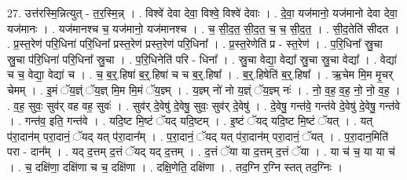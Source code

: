 \documentclass[17pt]{extarticle}
\begin{document}
27. उत्त॑रस्मि॒न्नित्युत् - त॒र॒स्मि॒न्न् । . विश्वे॑ देवा देवा॒ विश्वे॒ विश्वे॑ देवाः । . दे॒वा॒ यज॑मानो॒ यज॑मानो देवा देवा॒ यज॑मानः । . यज॑मानश्च च॒ यज॑मानो॒ यज॑मानश्च । . च॒ सी॒द॒त॒ सी॒द॒त॒ च॒ च॒ सी॒द॒त॒ । . सी॒द॒तेति॑ सीदत । . प्र॒स्त॒रेण॑ परि॒धिना॑ परि॒धिना᳚ प्रस्त॒रेण॑ प्रस्त॒रेण॑ परि॒धिना᳚ । . प्र॒स्त॒रेणेति॑ प्र - स्त॒रेण॑ । . प॒रि॒धिना᳚ स्रु॒चा स्रु॒चा प॑रि॒धिना॑ परि॒धिना᳚ स्रु॒चा । . प॒रि॒धिनेति॑ परि - धिना᳚ । . स्रु॒चा वेद्या॒ वेद्या᳚ स्रु॒चा स्रु॒चा वेद्या᳚ । . वेद्या॑ च च॒ वेद्या॒ वेद्या॑ च । . च॒ ब॒र्॒.हिषा॑ ब॒र्॒.हिषा॑ च च ब॒र्॒.हिषा᳚ । . ब॒र्॒.हिषेति॑ ब॒र्॒.हिषा᳚ । . ऋ॒चेम मि॒म मृ॒चर् चेमम् । . इ॒मं ॅय॒ज्ञ्ं ॅय॒ज्ञ् मि॒म मि॒मं ॅय॒ज्ञ्म् । . य॒ज्ञ्म् नो॑ नो य॒ज्ञ्ं ॅय॒ज्ञ्म् नः॑ । . नो॒ व॒ह॒ व॒ह॒ नो॒ नो॒ व॒ह॒ । . व॒ह॒ सुवः॒ सुव॑र् वह वह॒ सुवः॑ । . सुव॑र् दे॒वेषु॑ दे॒वेषु॒ सुवः॒ सुव॑र् दे॒वेषु॑ । . दे॒वेषु॒ गन्त॑वे॒ गन्त॑वे दे॒वेषु॑ दे॒वेषु॒ गन्त॑वे । . गन्त॑व॒ इति॒ गन्त॑वे । . यदि॒ष्ट मि॒ष्टं ॅयद् यदि॒ष्टम् । . इ॒ष्टं ॅयद् यदि॒ष्ट मि॒ष्टं ॅयत् । . यत् प॑रा॒दान॑म् परा॒दानं॒ ॅयद् यत् प॑रा॒दान᳚म् । . प॒रा॒दानं॒ ॅयद् यत् प॑रा॒दान॑म् परा॒दानं॒ ॅयत् । . प॒रा॒दान॒मिति॑ परा - दान᳚म् । . यद् द॒त्तम् द॒त्तं ॅयद् यद् द॒त्तम् । . द॒त्तं ॅया या द॒त्तम् द॒त्तं ॅया । . या च॑ च॒ या या च॑ । . च॒ दक्षि॑णा॒ दक्षि॑णा च च॒ दक्षि॑णा । . दक्षि॒णेति॒ दक्षि॑णा । . तद॒ग्नि र॒ग्नि स्तत् तद॒ग्निः । \newline
\end{document}

